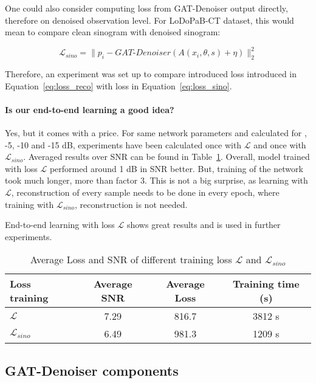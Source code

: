 One could also consider computing loss from GAT-Denoiser output directly, therefore on denoised observation level.
For LoDoPaB-CT dataset, this would mean to compare clean sinogram with denoised sinogram:

\begin{equation}
  \label{eq:loss_sino}
  \mathcal{L}_{sino} = \parallel p_i - \textit{GAT-Denoiser}(A(x_i, \theta, s) + \eta) \parallel ^2_2
\end{equation}

Therefore, an experiment was set up to compare introduced loss introduced in Equation~\ref{eq:loss_reco}
with loss in Equation~\ref{eq:loss_sino}.


\paragraph{Is our end-to-end learning a good idea?}
Yes, but it comes with a price. 
For same network parameters and calculated for , -5, -10 and -15 dB,
experiments have been calculated once with $\mathcal{L} $ and once with $\mathcal{L}_{sino}$.
Averaged results over SNR can be found in Table~\ref{tab:loss_sino_reco}. 
Overall, model trained with loss $\mathcal{L} $ performed around 1 dB in SNR better.
But, training of the network took much longer, more than factor 3. 
This is not a big surprise, as learning with $\mathcal{L} $, reconstruction of every sample
needs to be done in every epoch, where training with $\mathcal{L}_{sino}$, reconstruction is not needed.

End-to-end learning with loss $\mathcal{L} $ shows great results and is used in further experiments.

\begin{table}[H]
  \centering
    \begin{tabular}{l|ccc}
    \toprule
    \textbf{Loss training} & \textbf{Average SNR} & \textbf{Average Loss} & \textbf{Training time (s)}  \\ 
    \midrule
    $\mathcal{L} $         &  7.29    &  816.7  & 3812 s \\ \hline
    $\mathcal{L}_{sino}$   &  6.49    &  981.3  & 1209 s \\ \hline
    \midrule
    \end{tabular}
  \caption{Average Loss and SNR of different training loss $\mathcal{L}$ and $\mathcal{L}_{sino}$}
  \label{tab:loss_sino_reco}
\end{table}


\subsection{GAT-Denoiser components}


